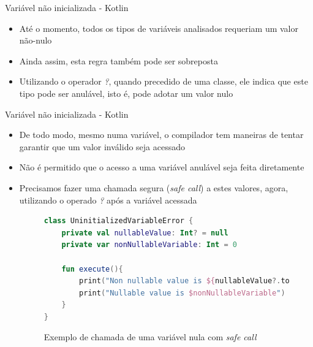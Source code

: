 \documentclass[brazilian]{beamer}
\begin{document}
\begin{frame}{Variável não inicializada - Kotlin}
    \begin{itemize}
        \item Até o momento, todos os tipos de variáveis analisados requeriam um valor não-nulo
        \item Ainda assim, esta regra também pode ser sobreposta
        \item Utilizando o operador \emph{?}, quando precedido de uma classe, ele indica que este tipo pode ser anulável, isto é, pode adotar um valor nulo
    \end{itemize}
\end{frame}

\begin{frame}[fragile]{Variável não inicializada - Kotlin}
    \begin{itemize}
        \item De todo modo, mesmo numa variável, o compilador tem maneiras de tentar garantir que um valor inválido seja acessado
        \item Não é permitido que o acesso a uma variável anulável seja feita diretamente
        \item Precisamos fazer uma chamada segura (\textit{safe call}) a estes valores, agora, utilizando o operado \emph{?} após a variável acessada
        \begin{figure}[H]
            \centering
            \begin{lstlisting}[language=Kotlin]
class UninitializedVariableError {
    private val nullableValue: Int? = null
    private var nonNullableVariable: Int = 0

    fun execute(){
        print("Non nullable value is ${nullableValue?.toFloat()}")
        print("Nullable value is $nonNullableVariable")
    }
}
            \end{lstlisting}
            \caption{Exemplo de chamada de uma variável nula com \textit{safe call}}
            \label{fig:kotlin_null_variable_with_safe_call}
        \end{figure}
    \end{itemize}
\end{frame}
\end{document}
